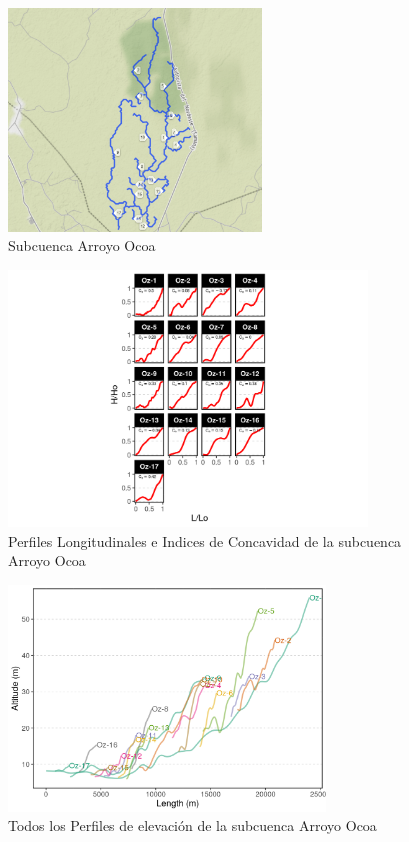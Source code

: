 \documentclass[11pt,]{article}
\begin{document}
\begin{figure}
\centering
\includegraphics[width=0.60000\textwidth]{Productos Generados/p_Ocoa.png}
\caption{\label{fig:LFP_ocoa0} Subcuenca Arroyo Ocoa}
\end{figure}

\begin{figure}
\centering
\includegraphics[width=0.85000\textwidth]{Productos Generados/p_c_ocoa1.png}
\caption{\label{fig:LFP_ocoa1} Perfiles Longitudinales e Indices de
Concavidad de la subcuenca Arroyo Ocoa}
\end{figure}

\begin{figure}
\centering
\includegraphics[width=0.75000\textwidth]{Productos Generados/p_c_ocoa.png}
\caption{\label{fig:LFP_ocoa2} Todos los Perfiles de elevación de la
subcuenca Arroyo Ocoa}
\end{figure}
\end{document}
